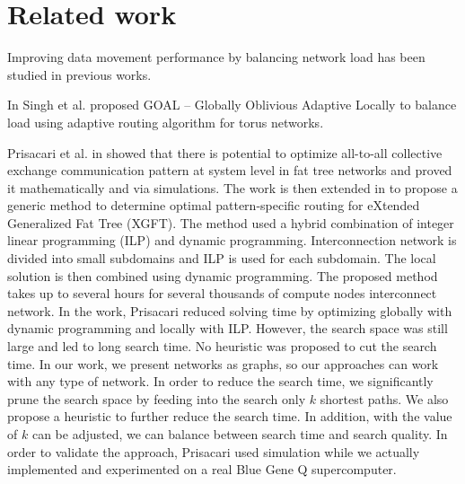 \section{Related work}
\label{sec:relatedwork}

Improving data movement performance by balancing network load has been studied in previous works. 

In \cite{singh2003:GOAL} Singh et al. proposed GOAL -- Globally Oblivious Adaptive Locally to balance load using adaptive routing algorithm for torus networks.



Prisacari et al. in \cite{Prisacari13a} showed that there is potential to optimize all-to-all collective exchange communication pattern at system level in fat tree networks and proved it mathematically and via simulations. The work is then extended in \cite{Prisacari13b} to propose a generic method to determine optimal pattern-specific routing for eXtended Generalized Fat Tree (XGFT). The method used a hybrid combination of integer linear programming (ILP) and dynamic programming. Interconnection network is divided into small subdomains and ILP is used for each subdomain. The local solution is then combined using dynamic programming. The proposed method takes up to several hours for several thousands of compute nodes interconnect network. In the work, Prisacari reduced solving time by optimizing globally with dynamic programming and locally with ILP. However, the search space was still large and led to long search time. No heuristic was proposed to cut the search time. In our work, we present networks as graphs, so our approaches can work with any type of network. In order to reduce the search time, we significantly prune the search space by feeding into the search only $k$ shortest paths. We also propose a heuristic to further reduce the search time. In addition, with the value of $k$ can be adjusted, we can balance between search time and search quality. In order to validate the approach, Prisacari used simulation while we actually implemented and experimented on a real Blue Gene Q supercomputer.


